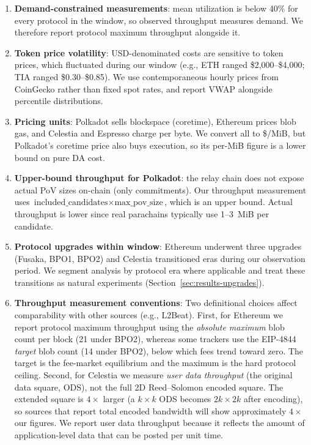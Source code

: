 \begin{enumerate}
    \item \textbf{Demand-constrained measurements}: mean utilization is below 40\% for every protocol in the window, so observed throughput measures demand. We therefore report protocol maximum throughput alongside it.

    \item \textbf{Token price volatility}: USD-denominated costs are sensitive to token prices, which fluctuated during our window (e.g., ETH ranged \$2,000--\$4,000; TIA ranged \$0.30--\$0.85). We use contemporaneous hourly prices from CoinGecko rather than fixed spot rates, and report VWAP alongside percentile distributions.

    \item \textbf{Pricing units}: Polkadot sells blockspace (coretime), Ethereum prices blob gas, and Celestia and Espresso charge per byte. We convert all to \$/MiB, but Polkadot's coretime price also buys execution, so its per-MiB figure is a lower bound on pure DA cost.

    \item \textbf{Upper-bound throughput for Polkadot}: the relay chain does not expose actual PoV sizes on-chain (only commitments). Our throughput measurement uses $\text{included\_candidates} \times \text{max\_pov\_size}$, which is an upper bound. Actual throughput is lower since real parachains typically use 1--3~MiB per candidate.

    \item \textbf{Protocol upgrades within window}: Ethereum underwent three upgrades (Fusaka, BPO1, BPO2) and Celestia transitioned eras during our observation period. We segment analysis by protocol era where applicable and treat these transitions as natural experiments (Section~\ref{sec:results-upgrades}).

    \item \textbf{Throughput measurement conventions}: Two definitional choices affect comparability with other sources (e.g., L2Beat).
    First, for Ethereum we report protocol maximum throughput using the \emph{absolute maximum} blob count per block (21 under BPO2), whereas some trackers use the EIP-4844 \emph{target} blob count (14 under BPO2), below which fees trend toward zero. The target is the fee-market equilibrium and the maximum is the hard protocol ceiling.
    Second, for Celestia we measure \emph{user data throughput} (the original data square, ODS), not the full 2D Reed--Solomon encoded square. The extended square is $4\times$ larger (a $k{\times}k$ ODS becomes $2k{\times}2k$ after encoding), so sources that report total encoded bandwidth will show approximately $4\times$ our figures. We report user data throughput because it reflects the amount of application-level data that can be posted per unit time.
\end{enumerate}

